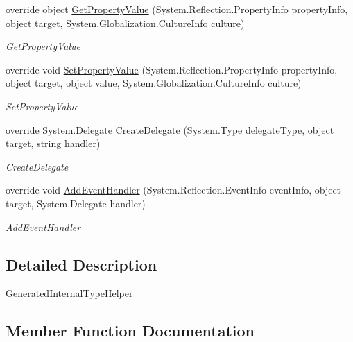 \begin{DoxyCompactItemize}
override object \mbox{\hyperlink{class_xaml_generated_namespace_1_1_generated_internal_type_helper_afdc9fe15b56607d02082908d934480c6}{Get\+Property\+Value}} (System.\+Reflection.\+Property\+Info property\+Info, object target, System.\+Globalization.\+Culture\+Info culture)
\begin{DoxyCompactList}\small\item\em Get\+Property\+Value \end{DoxyCompactList}\item 
override void \mbox{\hyperlink{class_xaml_generated_namespace_1_1_generated_internal_type_helper_ade0f04c0f7b18dd5b170e071d5534d38}{Set\+Property\+Value}} (System.\+Reflection.\+Property\+Info property\+Info, object target, object value, System.\+Globalization.\+Culture\+Info culture)
\begin{DoxyCompactList}\small\item\em Set\+Property\+Value \end{DoxyCompactList}\item 
override System.\+Delegate \mbox{\hyperlink{class_xaml_generated_namespace_1_1_generated_internal_type_helper_a8ec4c37e82d9f4e867e9655f4eac3a78}{Create\+Delegate}} (System.\+Type delegate\+Type, object target, string handler)
\begin{DoxyCompactList}\small\item\em Create\+Delegate \end{DoxyCompactList}\item 
override void \mbox{\hyperlink{class_xaml_generated_namespace_1_1_generated_internal_type_helper_a73471f4a6d1ca4c4fceec9ad8610f0c8}{Add\+Event\+Handler}} (System.\+Reflection.\+Event\+Info event\+Info, object target, System.\+Delegate handler)
\begin{DoxyCompactList}\small\item\em Add\+Event\+Handler \end{DoxyCompactList}\end{DoxyCompactItemize}


\subsection{Detailed Description}
\mbox{\hyperlink{class_xaml_generated_namespace_1_1_generated_internal_type_helper}{Generated\+Internal\+Type\+Helper}} 



\subsection{Member Function Documentation}
\mbox{\label{class_xaml_generated_namespace_1_1_generated_internal_type_helper_a73471f4a6d1ca4c4fceec9ad8610f0c8}} 
